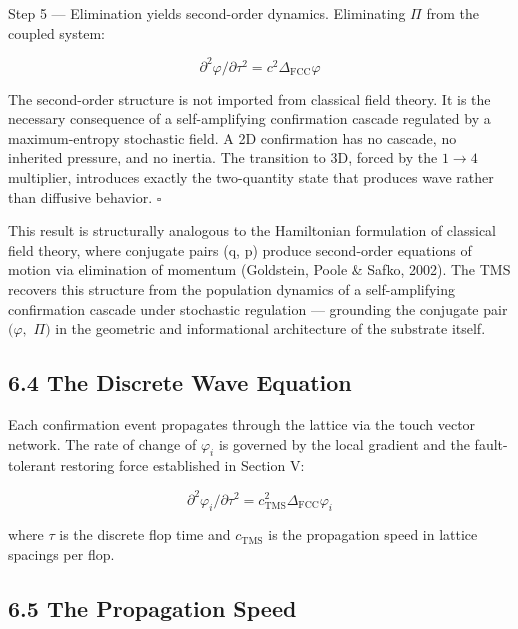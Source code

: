 \documentclass[11pt,oneside]{report}
\theoremstyle{definition}
\theoremstyle{remark}
\begin{document}
Step 5 --- Elimination yields second-order dynamics. Eliminating \ensuremath{\Pi} from
the coupled system:

\begin{equation*}
\partial ^{2}\varphi / \partial \tau^{2} = c^{2} \Delta_{\mathrm{FCC}} \varphi
\end{equation*}

The second-order structure is not imported from classical field theory.
It is the necessary consequence of a self-amplifying confirmation
cascade regulated by a maximum-entropy stochastic field. A 2D
confirmation has no cascade, no inherited pressure, and no inertia. The
transition to 3D, forced by the \ensuremath{1\to 4} multiplier, introduces exactly the
two-quantity state that produces wave rather than diffusive behavior. \hfill\ensuremath{\square}

This result is structurally analogous to the Hamiltonian formulation of
classical field theory, where conjugate pairs (q, p) produce
second-order equations of motion via elimination of momentum (Goldstein,
Poole \& Safko, 2002). The TMS recovers this structure from the
population dynamics of a self-amplifying confirmation cascade under
stochastic regulation --- grounding the conjugate pair \ensuremath{(\varphi ,} \ensuremath{\Pi )} in the
geometric and informational architecture of the substrate itself.

\subsection*{6.4 The Discrete Wave Equation}

Each confirmation event propagates through the lattice via the touch
vector network. The rate of change of \ensuremath{\varphi_{i}} is governed by the local
gradient and the fault-tolerant restoring force established in Section
V:

\begin{equation*}
\partial ^{2}\varphi_{i} / \partial \tau^{2} = c^{2}_{\mathrm{TMS}} \Delta_{\mathrm{FCC}} \varphi_{i}
\end{equation*}

where \ensuremath{\tau} is the discrete flop time and \ensuremath{c_{\mathrm{TMS}}} is the propagation speed in
lattice spacings per flop.

\subsection*{6.5 The Propagation Speed}
\end{document}
